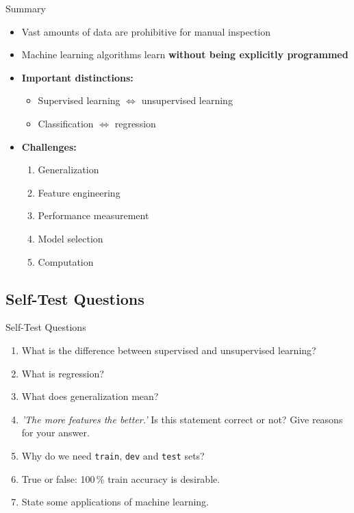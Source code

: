 \begin{frame}{Summary}{}
	\begin{itemize}
		\item Vast amounts of data are prohibitive for manual inspection
		\item Machine learning algorithms learn \textbf{without being explicitly programmed}
		\item \textbf{Important distinctions:}
		\begin{itemize}
			\item Supervised learning $\Leftrightarrow$ unsupervised learning
			\item Classification $\Leftrightarrow$ regression
		\end{itemize}
		\item \textbf{Challenges:}
		\begin{enumerate}
			\item Generalization
			\item Feature engineering
			\item Performance measurement
			\item Model selection
			\item Computation
		\end{enumerate}
	\end{itemize}
\end{frame}


\subsection{Self-Test Questions}

\begin{frame}{Self-Test Questions}{}\important
	\begin{enumerate}
		\item What is the difference between supervised and unsupervised learning?
		\item What is regression?
		\item What does generalization mean?
		\item \textit{'The more features the better.'} Is this statement correct or not? Give reasons for your answer.
		\item Why do we need \texttt{train}, \texttt{dev} and \texttt{test} sets?
		\item True or false: 100\,\% train accuracy is desirable.
		\item State some applications of machine learning.
	\end{enumerate}
\end{frame}


